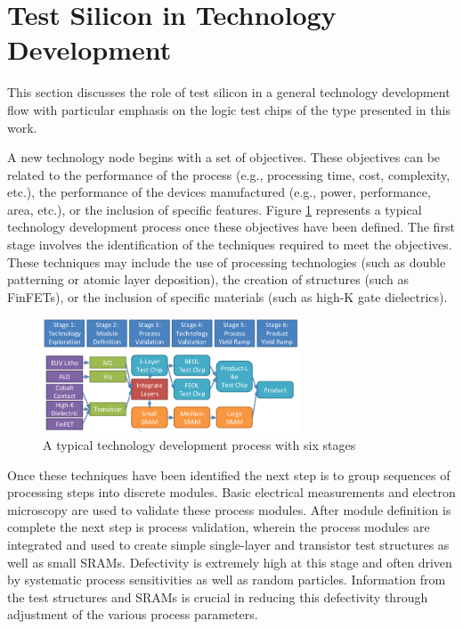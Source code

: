 \documentclass[journal]{IEEEtran}
\begin{document}
\section{Test Silicon in Technology Development} \label{test_silicon}

This section discusses the role of test silicon in a general technology development flow with particular emphasis on the logic test chips of the type presented in this work.

A new technology node begins with a set of objectives. These objectives can be related to the performance of the process (e.g., processing time, cost, complexity, etc.), the performance of the devices manufactured (e.g., power, performance, area, etc.), or the inclusion of specific features. Figure \ref{fig_flow} represents a typical technology development process once these objectives have been defined. The first stage involves the identification of the techniques required to meet the objectives. These techniques may include the use of processing technologies (such as double patterning or atomic layer deposition), the creation of structures (such as FinFETs), or the inclusion of specific materials (such as high-K gate dielectrics).

\begin{figure}[h]
	\centering
	\includegraphics[width=3in]{lcv_flow}
	\caption{A typical technology development process with six stages}
	\label{fig_flow}
\end{figure}


Once these techniques have been identified the next step is to group sequences of processing steps into discrete modules. Basic electrical measurements and electron microscopy are used to validate these process modules. After module definition is complete the next step is process validation, wherein the process modules are integrated and used to create simple single-layer and transistor test structures as well as small SRAMs. Defectivity is extremely high at this stage and often driven by systematic process sensitivities as well as random particles. Information from the test structures and SRAMs is crucial in reducing this defectivity through adjustment of the various process parameters.
\end{document}
